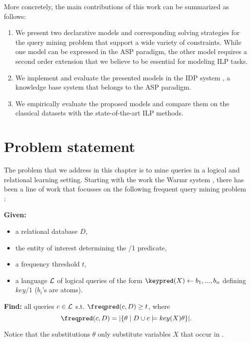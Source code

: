 More concretely, the main contributions of this work can be summarized as follows:
\begin{enumerate}
  \item We present two declarative models and corresponding solving strategies for the query mining problem that support a wide variety of constraints.  While one model can be expressed in the ASP paradigm, the other model requires a  second order extension that we believe
to be essential for modeling ILP tasks. 
  \item We implement and evaluate the presented models in the IDP system \parencite{idp}, a knowledge base system that belongs to the ASP paradigm.
  \item We empirically evaluate the proposed models and compare them on the classical datasets with the state-of-the-art ILP methods.
\end{enumerate}


\section{Problem statement}\label{sec:problem}

The problem that we address in this chapter is to mine queries in a logical and relational learning setting. Starting with the work the Warmr system \parencite{warmr}, there has been a line of work that focusses on the following frequent query mining problem \parencite{bagm,farmer,condensed_luc}:


\noindent
{\bf Given:} \vspace{-8pt}
\begin{itemize}
\item a relational database $D$,
\item the entity of interest determining the \keypred/1 predicate,
\item a frequency threshold $t$,
\item a language ${\cal L}$ of logical queries of the form $\keypred(X) \leftarrow b_1, ..., b_n$ defining $key/1$ ($b_i$'s are atoms).
\end{itemize}\vspace{-5pt}
{\bf Find:} all queries $c \in {\cal L}$ s.t. $\freqpred(c,D) \geq t$, where 
\begin{equation*}
\freqpred(c,D) = |\{\theta \mid D \cup c \models key(X)\theta \}|.
\end{equation*}

Notice that the substitutions $\theta$ only substitute variables $X$ that occur in \keypred. 

